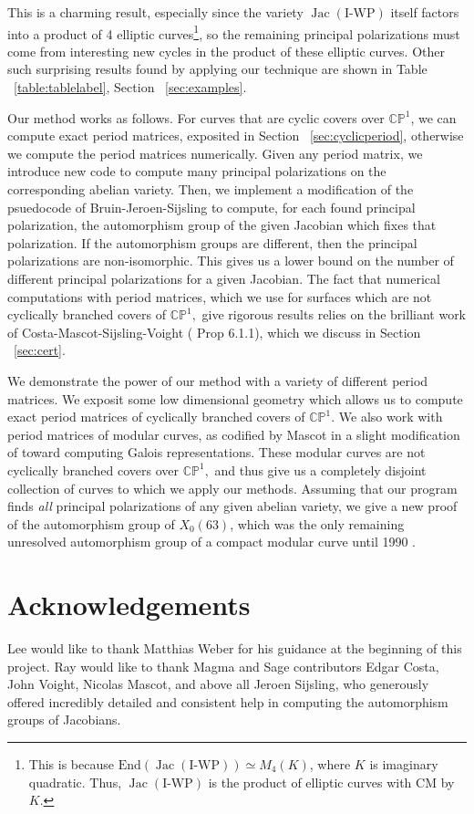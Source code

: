 \documentclass[12pt,reqno]{amsart}
\DeclareMathOperator{\Jac}{Jac}
\newcommand{\C}{\mathbb{C}}
\newcommand{\bb}{\mathbb}
\renewcommand{\P}{\mathbb{P}}
\theoremstyle{definition}
\theoremstyle{remark}
\begin{document}
This is a charming result, especially since the variety $\Jac(\text{I-WP})$ itself factors into a product of 4 elliptic curves\footnote{This is because $\text{End}(\Jac(\text{I-WP})) \simeq M_4(K)$, where $K$ is imaginary quadratic. Thus, $\Jac(\text{I-WP})$ is the product of elliptic curves with CM by $K$.}, so the remaining principal polarizations must come from interesting new cycles in the product of these elliptic curves. Other such surprising results found by applying our technique are shown in Table ~\ref{table:tablelabel}, Section ~\ref{sec:examples}.

Our method works as follows. For curves that are cyclic covers over $\C\bb{P}^1$, we can compute exact period matrices, exposited in Section ~\ref{sec:cyclicperiod}, otherwise we compute the period matrices numerically. Given any period matrix, we introduce new code to compute many principal polarizations on the corresponding abelian variety.  Then, we implement a modification of the psuedocode of Bruin-Jeroen-Sijsling \cite{numerical} to compute, for each found principal polarization, the automorphism group of the given Jacobian which fixes that polarization. If the automorphism groups are different, then the principal polarizations are non-isomorphic. This gives us a lower bound on the number of different principal polarizations for a given Jacobian. The fact that numerical computations with period matrices, which we use for surfaces which are not cyclically branched covers of $\C\P^1,$ give rigorous results relies on the brilliant work of Costa-Mascot-Sijsling-Voight (\cite{rigor} Prop 6.1.1), which we discuss in Section ~\ref{sec:cert}.

We demonstrate the power of our method with a variety of different period matrices. We exposit some low dimensional geometry which allows us to compute exact period matrices of cyclically branched covers of $\C\P^1.$ We also work with period matrices of modular curves, as codified by Mascot in a slight modification of \cite{n} toward computing Galois representations. These modular curves are not cyclically branched covers over $\C\P^1,$ and thus give us a completely disjoint collection of curves to which we apply our methods. Assuming that our program finds \textit{all} principal polarizations of any given abelian variety, we give a new proof of the automorphism group of $X_0(63)$, which was the only remaining unresolved automorphism group of a compact modular curve until 1990 \cite{elkies}.  


\section*{Acknowledgements} 
Lee would like to thank Matthias Weber for his guidance at the beginning of this project. Ray would like to thank Magma and Sage contributors Edgar Costa, John Voight, Nicolas Mascot, and above all Jeroen Sijsling, who generously offered incredibly detailed and consistent help in computing the automorphism groups of Jacobians.
\end{document}
